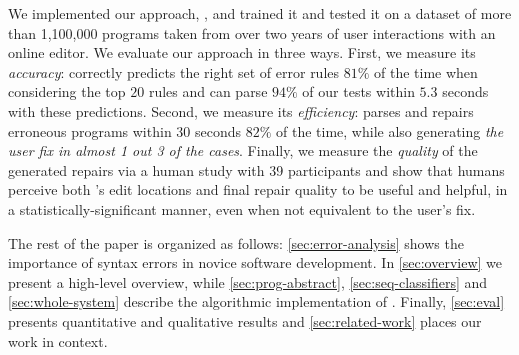 We implemented our approach, \toolname, and trained it and tested it on a
dataset of more than 1,100,000 programs taken from over two years of user
interactions with an online editor. We evaluate our approach in three ways.
%
First, we measure its \emph{accuracy}: \toolname correctly predicts
the right set of error rules $81\%$ of the time when considering the top $20$
rules and can parse $94\%$ of our tests within $5.3$ seconds with these
predictions.
%
Second, we measure its \emph{efficiency}: \toolname
parses and repairs erroneous programs within $30$ seconds $82\%$ of the time,
while also generating \emph{the user fix in almost 1 out 3 of the cases}.
%
Finally, we measure the \emph{quality} of the generated repairs via a human study
with 39 participants and show that humans perceive both \toolname's edit
locations and final repair quality to be useful and helpful,
in a statistically-significant manner, even when not equivalent to the user's fix.


The rest of the paper is organized as follows: \autoref{sec:error-analysis}
shows the importance of syntax errors in novice software
development. 
In \autoref{sec:overview} we present a high-level overview, while 
\autoref{sec:prog-abstract}, \autoref{sec:seq-classifiers} and
\autoref{sec:whole-system} describe the algorithmic implementation of 
\toolname. Finally, \autoref{sec:eval} presents quantitative and
qualitative results and \autoref{sec:related-work} places our work in 
context.
